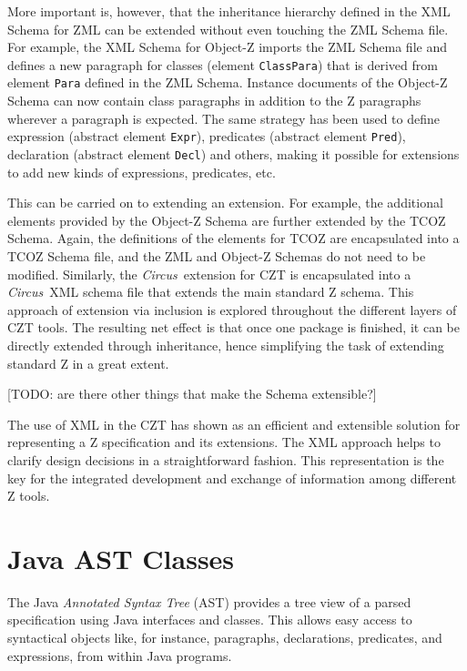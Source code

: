 \documentclass{llncs}
\newcommand{\Circus}{{\sf\slshape Circus}}
\newcommand{\Element}[1]{\texttt{#1}}
\begin{document}
  More important is, however, that the inheritance hierarchy defined
  in the XML Schema for ZML can be extended without even touching the
  ZML Schema file.  For example, the XML Schema for Object-Z imports
  the ZML Schema file and defines a new paragraph for classes (element
  \Element{ClassPara}) that is derived from element \Element{Para}
  defined in the ZML Schema.  Instance documents of the Object-Z
  Schema can now contain class paragraphs in addition to the Z
  paragraphs wherever a paragraph is expected.  The same strategy has
  been used to define expression (abstract element \Element{Expr}),
  predicates (abstract element \Element{Pred}), declaration (abstract
  element \Element{Decl}) and others, making it possible for
  extensions to add new kinds of expressions, predicates, etc.

  This can be carried on to extending an extension.  For example, the
  additional elements provided by the Object-Z Schema are further
  extended by the TCOZ Schema.  Again, the definitions of the elements
  for TCOZ are encapsulated into a TCOZ Schema file, and the ZML and
  Object-Z Schemas do not need to be modified.
  Similarly, the \Circus\ extension for CZT is encapsulated into a
  \Circus\ XML schema file that extends the main standard Z schema.
  This approach of extension via inclusion is explored throughout the
  different layers of CZT tools.
  The resulting net effect is that once one package is finished, it
  can be directly extended through inheritance, hence simplifying the
  task of extending standard Z in a great extent.

  [TODO: are there other things that make the Schema extensible?]

  The use of XML in the CZT has shown as an efficient and extensible
  solution for representing a Z specification and its extensions.  The
  XML approach helps to clarify design decisions in a straightforward
  fashion.  This representation is the key for the integrated
  development and exchange of information among different Z tools.

\section{Java AST Classes}\label{java-ast-classes}

  The Java \emph{Annotated Syntax Tree} (AST) provides a tree view of
  a parsed specification using Java interfaces and classes.  This
  allows easy access to syntactical objects like, for instance,
  paragraphs, declarations, predicates, and expressions, from within
  Java programs.
\end{document}
